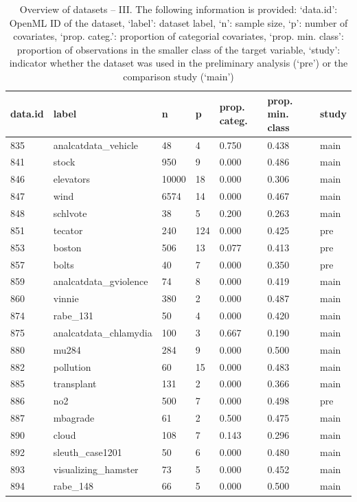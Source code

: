 \begin{table}[!htb]
\caption{Overview of datasets -- III. The following information is provided: `data.id': OpenML ID of the dataset, `label': dataset label, `n': sample size, `p': number of covariates, `prop. categ.': proportion of categorial covariates, `prop. min. class': proportion of observations in the smaller class of the target variable, `study': indicator whether the dataset was used in the preliminary analysis (`pre') or the comparison study (`main')}
\label{tab:data3}
\begin{tabular}{l | l | l | l | l | l | l}
data.id & label & n & p & prop. categ. & prop. min. class & study \\
\hline
835 & analcatdata\_vehicle & 48 & 4 & 0.750 & 0.438 & main \\
841 & stock & 950 & 9 & 0.000 & 0.486 & main \\
846 & elevators & 10000 & 18 & 0.000 & 0.306 & main \\
847 & wind & 6574 & 14 & 0.000 & 0.467 & main \\
848 & schlvote & 38 & 5 & 0.200 & 0.263 & main \\
851 & tecator & 240 & 124 & 0.000 & 0.425 & pre \\
853 & boston & 506 & 13 & 0.077 & 0.413 & pre \\
857 & bolts & 40 & 7 & 0.000 & 0.350 & pre \\
859 & analcatdata\_gviolence & 74 & 8 & 0.000 & 0.419 & main \\
860 & vinnie & 380 & 2 & 0.000 & 0.487 & main \\
874 & rabe\_131 & 50 & 4 & 0.000 & 0.420 & main \\
875 & analcatdata\_chlamydia & 100 & 3 & 0.667 & 0.190 & main \\
880 & mu284 & 284 & 9 & 0.000 & 0.500 & main \\
882 & pollution & 60 & 15 & 0.000 & 0.483 & main \\
885 & transplant & 131 & 2 & 0.000 & 0.366 & main \\
886 & no2 & 500 & 7 & 0.000 & 0.498 & pre \\
887 & mbagrade & 61 & 2 & 0.500 & 0.475 & main \\
890 & cloud & 108 & 7 & 0.143 & 0.296 & main \\
892 & sleuth\_case1201 & 50 & 6 & 0.000 & 0.480 & main \\
893 & visualizing\_hamster & 73 & 5 & 0.000 & 0.452 & main \\
894 & rabe\_148 & 66 & 5 & 0.000 & 0.500 & main \\

\end{tabular}
\end{table}
